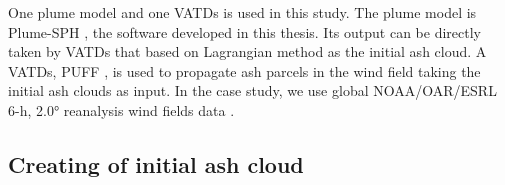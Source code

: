One plume model and one VATDs is used in this study.
The plume model is Plume-SPH \citep{gmd-2017-119}, the software developed in this thesis. Its output can be directly taken by VATDs that based on Lagrangian method as the initial ash cloud. A VATDs, PUFF \citep{tanaka1991development,searcy1998puff}, is used to propagate ash parcels in the wind field taking the initial ash clouds as input. In the case study, we use global NOAA/OAR/ESRL 6-h, 2.0° reanalysis wind fields data \citep{whitaker2004reanalysis, compo2006feasibility, compo2011twentieth}.

\subsection{Creating of initial ash cloud}

